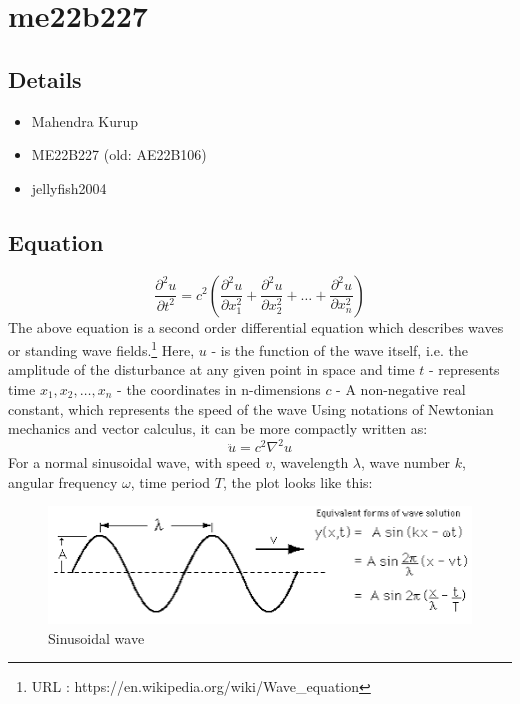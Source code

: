 \documentclass{article}
\begin{document}
\boldmath
\section{me22b227}
\subsection{Details}
\begin{itemize}
    \item Mahendra Kurup
    \item ME22B227 (old: AE22B106)
    \item jellyfish2004
\end{itemize}
    
\subsection{Equation \cite{enwiki:1160233109}} 
\large
\[\frac{\partial^{2}{u}}{\partial{t}^2}=c^2(\frac{\partial^2 u}{\partial x_1 ^2}+\frac{\partial^2 u}{\partial x_2 ^2}+\ldots+\frac{\partial^2 u}{\partial x_n ^2}) \] 
\normalsize
\noindent The above equation is a second order differential equation which describes waves or standing wave fields.\footnote{URL : https://en.wikipedia.org/wiki/Wave\_equation}
Here,
\newline
\newline$u$ - is the function of the wave itself, i.e. the amplitude of the disturbance at any given point in space and time
\newline$t$ - represents time
\newline$x_1, x_2, \ldots, x_n$ - the coordinates in n-dimensions
\newline$c$ - A non-negative real constant, which represents the speed of the wave
\newline
\newline Using notations of Newtonian mechanics and vector calculus, it can be more compactly written as:
\[\ddot u = c^2 \nabla^2 u\]
For a normal sinusoidal wave, with speed $v$, wavelength $\lambda$, wave number $k$, angular frequency $\omega$, time period $T$, the plot looks like this:
\begin{figure}[H]
    \centering
    \includegraphics[width=10 cm]{wave.png}
    \caption{Sinusoidal wave}
    \label{fig:enter-label}
\end{figure}
\end{document}
